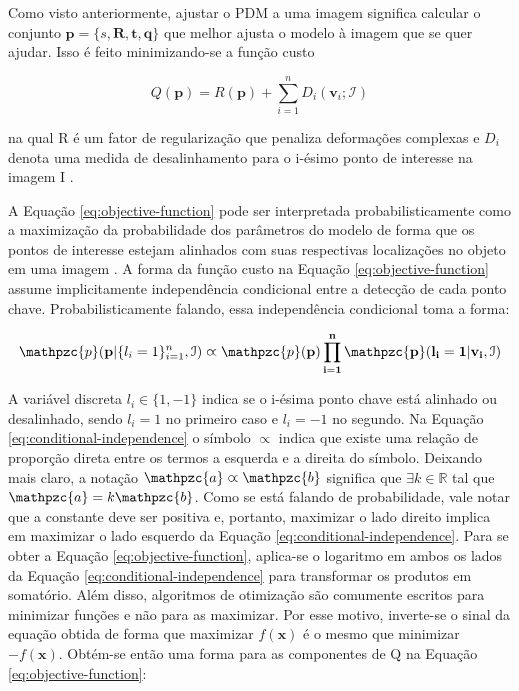 {Como visto anteriormente, ajustar o PDM a uma imagem significa calcular o
conjunto $\mathbf{p} = \{s, \bm{R}, \bm{t}, \bm{q}\}$ que melhor ajusta o modelo
à imagem que se quer ajudar. Isso é feito minimizando-se a função custo

\begin{equation}
Q(\mathbf{p}) = R(\mathbf{p}) + \sum_{i=1}^n D_i(\mathbf{v}_i; \mathcal{I})
\label{eq:objective-function}
\end{equation}

na qual R é um fator de regularização que penaliza deformações complexas e $D_i$
denota uma medida de desalinhamento para o i-ésimo ponto de interesse na imagem
I \cite{facetracker}.

A Equação \ref{eq:objective-function} pode ser interpretada probabilisticamente
como a maximização da probabilidade dos parâmetros do modelo de forma que os
pontos de interesse estejam alinhados com suas respectivas localizações no
objeto em uma imagem \cite{facetracker}. A forma da função custo na Equação
\ref{eq:objective-function} assume implicitamente independência condicional
entre a detecção de cada ponto chave. Probabilisticamente falando, essa
independência condicional toma a forma:

\begin{equation}
\label{eq:conditional-independence}
\mathpzc{p}(\mathbf{p} | \{l_i = 1\}_{i=1}^n, \mathcal{I}) \varpropto \mathpzc{p}(\bf{p}) \prod_{i=1}^n \mathpzc{p}(l_i = 1 | \mathbf{v}_i, \mathcal{I})
\end{equation}

A variável discreta $l_i \in \{1, -1\}$ indica se o i-ésima ponto chave está
alinhado ou desalinhado, sendo $l_i=1$ no primeiro caso e $l_i=-1$ no segundo.
Na Equação \ref{eq:conditional-independence} o símbolo $\varpropto$ indica que
existe uma relação de proporção direta entre os termos a esquerda e a direita do
símbolo. Deixando mais claro, a notação $\mathpzc{a} \varpropto \mathpzc{b}$
significa que $\exists k \in \mathbb{R}$ tal que $\mathpzc{a} = k \mathpzc{b}$.
Como se está falando de probabilidade, vale notar que a constante deve ser
positiva e, portanto, maximizar o lado direito implica em maximizar o lado
esquerdo da Equação \ref{eq:conditional-independence}.  Para se obter a Equação
\ref{eq:objective-function}, aplica-se o logaritmo em ambos os lados da Equação
\ref{eq:conditional-independence} para transformar os produtos em somatório.
Além disso, algoritmos de otimização são comumente escritos para minimizar
funções e não para as maximizar. Por esse motivo, inverte-se o sinal da equação
obtida de forma que maximizar $f(\mathbf{x})$ é o mesmo que minimizar
$-f(\mathbf{x})$. Obtém-se então uma forma para as componentes de Q na Equação
\ref{eq:objective-function}:

}
